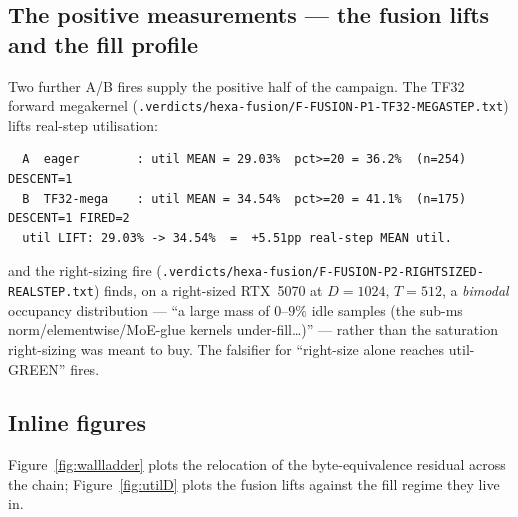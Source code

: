\documentclass[11pt,a4paper]{article}
\newcommand{\verdict}[1]{\texttt{.verdicts/hexa-fusion/#1}}
\begin{document}
\subsection{The positive measurements --- the fusion lifts and the fill profile}
\label{sec:fill-data}

Two further A/B fires supply the positive half of the campaign. The TF32
forward megakernel (\verdict{F-FUSION-P1-TF32-MEGASTEP.txt}) lifts real-step
utilisation:

\begin{lstlisting}
  A  eager        : util MEAN = 29.03%  pct>=20 = 36.2%  (n=254)  DESCENT=1
  B  TF32-mega    : util MEAN = 34.54%  pct>=20 = 41.1%  (n=175)  DESCENT=1 FIRED=2
  util LIFT: 29.03% -> 34.54%  =  +5.51pp real-step MEAN util.
\end{lstlisting}

\noindent and the right-sizing fire (\verdict{F-FUSION-P2-RIGHTSIZED-REALSTEP.txt})
finds, on a right-sized RTX~5070 at $D{=}1024,\,T{=}512$, a \emph{bimodal}
occupancy distribution --- ``a large mass of $0$--$9\%$ idle samples (the
sub-ms norm/elementwise/MoE-glue kernels under-fill\dots)'' --- rather than
the saturation right-sizing was meant to buy. The falsifier for ``right-size
alone reaches util-GREEN'' fires.

\subsection{Inline figures}
\label{sec:figs}

Figure~\ref{fig:wallladder} plots the relocation of the byte-equivalence
residual across the chain; Figure~\ref{fig:utilD} plots the fusion lifts
against the fill regime they live in.
\end{document}
